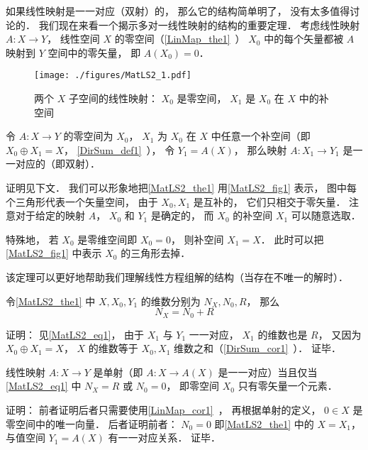 

如果线性映射是一一对应（双射）的， 那么它的结构简单明了， 没有太多值得讨论的． 我们现在来看一个揭示多对一线性映射的结构的重要定理． 考虑线性映射 $A:X\to Y$， 线性空间 $X$ 的零空间（\autoref{LinMap_the1}~） $X_0$ 中的每个矢量都被 $A$ 映射到 $Y$ 空间中的零矢量， 即 $A(X_0) = \qty{0}$．

\begin{figure}[ht]
\centering
\texttt{[image: ./figures/MatLS2\_1.pdf]}
\caption{两个 $X$ 子空间的线性映射： $X_0$ 是零空间， $X_1$ 是 $X_0$ 在 $X$ 中的补空间} \label{MatLS2_fig1}
\end{figure}

\begin{theorem}{}\label{MatLS2_the1}
令 $A:X \to Y$ 的零空间为 $X_0$， $X_1$ 为 $X_0$ 在 $X$ 中任意一个补空间（即 $X_0\oplus X_1 = X$， \autoref{DirSum_def1}~）， 令 $Y_1 = A(X)$， 那么映射 $A:X_1\to Y_1$ 是一一对应的（即双射）．
\end{theorem}
证明见下文． 我们可以形象地把\autoref{MatLS2_the1} 用\autoref{MatLS2_fig1} 表示， 图中每个三角形代表一个矢量空间， 由于 $X_0, X_1$ 是互补的， 它们只相交于零矢量． 注意对于给定的映射 $A$， $X_0$ 和 $Y_1$ 是确定的， 而 $X_0$ 的补空间 $X_1$ 可以随意选取．

特殊地， 若 $X_0$ 是零维空间即 $X_0 = \qty{0}$， 则补空间 $X_1 = X$． 此时可以把\autoref{MatLS2_fig1} 中表示 $X_0$ 的三角形去掉．

该定理可以更好地帮助我们理解线性方程组解的结构（当存在不唯一的解时）．

\begin{corollary}{}
令\autoref{MatLS2_the1} 中 $X, X_0, Y_1$ 的维数分别为 $N_X, N_0, R$， 那么
\begin{equation}\label{MatLS2_eq1}
N_X = N_0 + R
\end{equation}
\end{corollary}
证明： 见\autoref{MatLS2_eq1}， 由于 $X_1$ 与 $Y_1$ 一一对应， $X_1$ 的维数也是 $R$， 又因为 $X_0\oplus X_1 = X$， $X$ 的维数等于 $X_0, X_1$ 维数之和（\autoref{DirSum_cor1}~）． 证毕．

\begin{corollary}{}
线性映射 $A:X\to Y$ 是单射（即 $A:X\to A(X)$ 是一一对应）当且仅当\autoref{MatLS2_eq1} 中 $N_X = R$ 或 $N_0 = 0$， 即零空间 $X_0$ 只有零矢量一个元素．
\end{corollary}
证明： 前者证明后者只需要使用\autoref{LinMap_cor1}~， 再根据单射的定义， $0\in X$ 是零空间中的唯一向量． 后者证明前者： $N_0 = 0$ 即\autoref{MatLS2_the1} 中的 $X = X_1$， 与值空间 $Y_1 = A(X)$ 有一一对应关系． 证毕．

